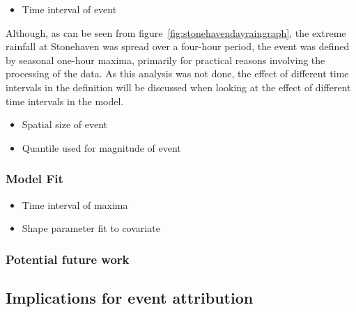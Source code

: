 
\begin{itemize}\item Time interval of event\end{itemize}

Although, as can be seen from figure~\ref{fig:stonehavendayraingraph},
    the extreme rainfall at Stonehaven was spread over a four-hour period,
    the event was defined by seasonal one-hour maxima,
    primarily for practical reasons involving the processing of the data.
As this analysis was not done,
    the effect of different time intervals in the definition will be discussed when looking at the effect of
    different time intervals in the model.

\begin{itemize}\item Spatial size of event\end{itemize}


\begin{itemize}\item Quantile used for magnitude of event\end{itemize}


\subsubsection{Model Fit}

\begin{itemize}\item Time interval of maxima\end{itemize}

\begin{itemize}\item Shape parameter fit to covariate\end{itemize}


\subsubsection{Potential future work}




\subsection{Implications for event attribution}\label{subsec:disfield}


